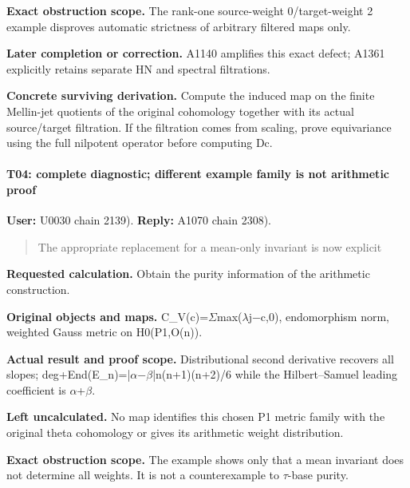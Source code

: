 \textbf{Exact obstruction scope.} The rank-one source-weight
0/target-weight 2 example disproves automatic strictness of arbitrary
filtered maps only.

\textbf{Later completion or correction.} A1140 amplifies this exact
defect; A1361 explicitly retains separate HN and spectral filtrations.

\textbf{Concrete surviving derivation.} Compute the induced map on the
finite Mellin-jet quotients of the original cohomology together with its
actual source/target filtration. If the filtration comes from scaling,
prove equivariance using the full nilpotent operator before computing
Dc.

\paragraph{T04: complete diagnostic; different example family is not
arithmetic
proof}\label{t04-complete-diagnostic-different-example-family-is-not-arithmetic-proof}

\textbf{User:} U0030
\protect{} chain 2139).
\textbf{Reply:} A1070
\protect{} chain 2308).

\begin{quote}
The appropriate replacement for a mean-only invariant is now explicit
\end{quote}

\textbf{Requested calculation.} Obtain the purity information of the
arithmetic construction.

\textbf{Original objects and maps.}
C\_V(c)=\allowbreak{}\ensuremath{Σ}\allowbreak{}max(\allowbreak{}\ensuremath{λ}\allowbreak{}j\allowbreak{}\ensuremath{−}\allowbreak{}c,0),
endomorphism norm, weighted Gauss metric on H0(P1,O(n)).

\textbf{Actual result and proof scope.} Distributional second derivative
recovers all slopes;
deg+End(E\_n)=|\allowbreak{}\ensuremath{α}\allowbreak{}\allowbreak{}\ensuremath{−}\allowbreak{}\allowbreak{}\ensuremath{β}\allowbreak{}|n(n+1)(n+2)/6
while the Hilbert--Samuel leading coefficient is
\allowbreak{}\ensuremath{α}\allowbreak{}+\allowbreak{}\ensuremath{β}\allowbreak{}.

\textbf{Left uncalculated.} No map identifies this chosen P1 metric
family with the original theta cohomology or gives its arithmetic weight
distribution.

\textbf{Exact obstruction scope.} The example shows only that a mean
invariant does not determine all weights. It is not a counterexample to
\allowbreak{}\ensuremath{τ}\allowbreak{}-base purity.

